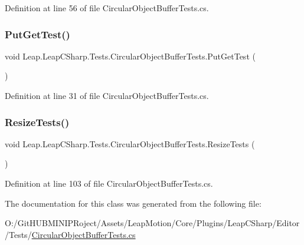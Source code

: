 Definition at line 56 of file Circular\+Object\+Buffer\+Tests.\+cs.

\mbox{\label{class_leap_1_1_leap_c_sharp_1_1_tests_1_1_circular_object_buffer_tests_af0dc9dbcd071c5ec27027637c7889af1}} 
\subsubsection{\texorpdfstring{PutGetTest()}{PutGetTest()}}
{\footnotesize\ttfamily void Leap.\+Leap\+C\+Sharp.\+Tests.\+Circular\+Object\+Buffer\+Tests.\+Put\+Get\+Test (\begin{DoxyParamCaption}{ }\end{DoxyParamCaption})}



Definition at line 31 of file Circular\+Object\+Buffer\+Tests.\+cs.

\mbox{\label{class_leap_1_1_leap_c_sharp_1_1_tests_1_1_circular_object_buffer_tests_a8848cce0f507da8c50da295bedfae991}} 
\subsubsection{\texorpdfstring{ResizeTests()}{ResizeTests()}}
{\footnotesize\ttfamily void Leap.\+Leap\+C\+Sharp.\+Tests.\+Circular\+Object\+Buffer\+Tests.\+Resize\+Tests (\begin{DoxyParamCaption}{ }\end{DoxyParamCaption})}



Definition at line 103 of file Circular\+Object\+Buffer\+Tests.\+cs.



The documentation for this class was generated from the following file\+:\begin{DoxyCompactItemize}
\item 
O\+:/\+Git\+H\+U\+B\+M\+I\+N\+I\+P\+Roject/\+Assets/\+Leap\+Motion/\+Core/\+Plugins/\+Leap\+C\+Sharp/\+Editor/\+Tests/\mbox{\hyperlink{_circular_object_buffer_tests_8cs}{Circular\+Object\+Buffer\+Tests.\+cs}}\end{DoxyCompactItemize}
